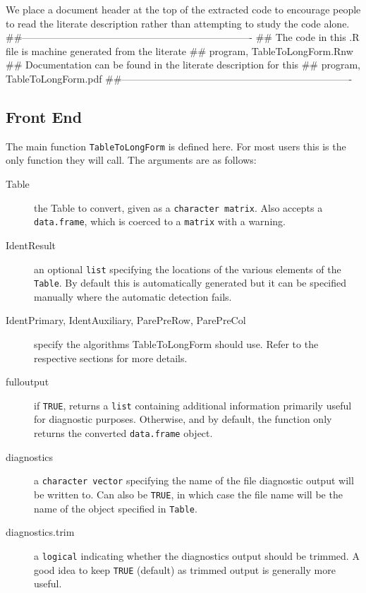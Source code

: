 \documentclass[a4paper]{article}
\begin{document}
We place a document header at the top of the extracted code to
encourage people to read the literate description rather than
attempting to study the code alone.
\nwenddocs{}\endmoddef
##----------------------------------------------------------------------
## The code in this .R file is machine generated from the literate
##  program, TableToLongForm.Rnw
## Documentation can be found in the literate description for this
##  program, TableToLongForm.pdf
##----------------------------------------------------------------------
\nwendcode{}\nwdocspar

\subsection{Front End}
\label{sec:front.end}
The main function \verb|TableToLongForm| is defined here. For most
users this is the only function they will call. The arguments are as
follows:

\begin{description}
\item[Table] the Table to convert, given as a \verb|character matrix|.
  Also accepts a \verb|data.frame|, which is coerced to a \verb|matrix|
  with a warning.
\item[IdentResult] an optional \verb|list| specifying the locations of
  the various elements of the \verb|Table|. By default this is
  automatically generated but it can be specified manually where the
  automatic detection fails.
\item[IdentPrimary, IdentAuxiliary, ParePreRow, ParePreCol] specify
  the algorithms TableToLongForm should use. Refer to the respective
  sections for more details.
\item[fulloutput] if \verb|TRUE|, returns a \verb|list| containing
  additional information primarily useful for diagnostic
  purposes. Otherwise, and by default, the function only returns the
  converted \verb|data.frame| object.
\item[diagnostics] a \verb|character vector| specifying the name of
  the file diagnostic output will be written to. Can also be
  \verb|TRUE|, in which case the file name will be the name of the
  object specified in \verb|Table|.
\item[diagnostics.trim] a \verb|logical| indicating whether the
  diagnostics output should be trimmed. A good idea to keep
  \verb|TRUE| (default) as trimmed output is generally more useful.
\end{description}
\end{document}
